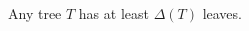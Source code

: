 \documentclass[a4paper]{article}
\begin{document}
	\begin{solution}{1}
		\begin{theorem}{Any tree $T$ has at least $\Delta(T)$ leaves.}		
%
%


\end{theorem}
\end{solution}
\end{document}
